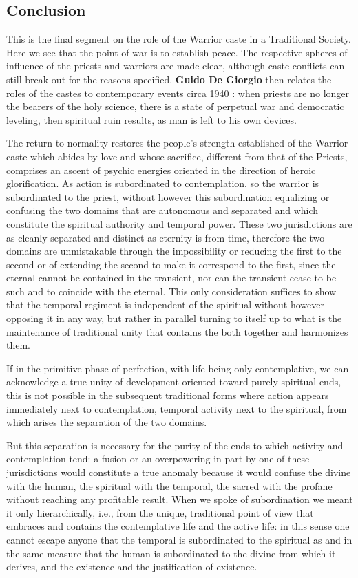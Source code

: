 \subsection*{Conclusion}
\begin{quotex}
This is the final segment on the role of the Warrior caste in a Traditional Society. Here we see that the point of war is to establish peace. The respective spheres of influence of the priests and warriors are made clear, although caste conflicts can still break out for the reasons specified. \textbf{Guido De Giorgio} then relates the roles of the castes to contemporary events circa 1940 : when priests are no longer the bearers of the holy science, there is a state of perpetual war and democratic leveling, then spiritual ruin results, as man is left to his own devices.
\end{quotex}


The return to normality restores the people's strength established of the Warrior caste which abides by love and whose sacrifice, different from that of the Priests, comprises an ascent of psychic energies oriented in the direction of heroic glorification. As action is subordinated to contemplation, so the warrior is subordinated to the priest, without however this subordination equalizing or confusing the two domains that are autonomous and separated and which constitute the spiritual authority and temporal power. These two jurisdictions are as cleanly separated and distinct as eternity is from time, therefore the two domains are unmistakable through the impossibility or reducing the first to the second or of extending the second to make it correspond to the first, since the eternal cannot be contained in the transient, nor can the transient cease to be such and to coincide with the eternal. This only consideration suffices to show that the temporal regiment is independent of the spiritual without however opposing it in any way, but rather in parallel turning to itself up to what is the maintenance of traditional unity that contains the both together and harmonizes them.

If in the primitive phase of perfection, with life being only contemplative, we can acknowledge a true unity of development oriented toward purely spiritual ends, this is not possible in the subsequent traditional forms where action appears immediately next to contemplation, temporal activity next to the spiritual, from which arises the separation of the two domains.

But this separation is necessary for the purity of the ends to which activity and contemplation tend: a fusion or an overpowering in part by one of these jurisdictions would constitute a true anomaly because it would confuse the divine with the human, the spiritual with the temporal, the sacred with the profane without reaching any profitable result. When we spoke of subordination we meant it only hierarchically, i.e., from the unique, traditional point of view that embraces and contains the contemplative life and the active life: in this sense one cannot escape anyone that the temporal is subordinated to the spiritual as and in the same measure that the human is subordinated to the divine from which it derives, and the existence and the justification of existence.

